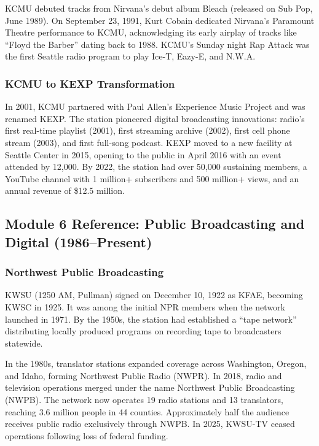 \documentclass[11pt,letterpaper]{article}
\begin{document}
KCMU debuted tracks from Nirvana's debut album Bleach (released on Sub Pop, June 1989). On September 23, 1991, Kurt Cobain dedicated Nirvana's Paramount Theatre performance to KCMU, acknowledging its early airplay of tracks like ``Floyd the Barber'' dating back to 1988. KCMU's Sunday night Rap Attack was the first Seattle radio program to play Ice-T, Eazy-E, and N.W.A.

\subsubsection{KCMU to KEXP Transformation}

In 2001, KCMU partnered with Paul Allen's Experience Music Project and was renamed KEXP. The station pioneered digital broadcasting innovations: radio's first real-time playlist (2001), first streaming archive (2002), first cell phone stream (2003), and first full-song podcast. KEXP moved to a new facility at Seattle Center in 2015, opening to the public in April 2016 with an event attended by 12,000. By 2022, the station had over 50,000 sustaining members, a YouTube channel with 1 million+ subscribers and 500 million+ views, and an annual revenue of \$12.5 million.

\subsection{Module 6 Reference: Public Broadcasting and Digital (1986--Present)}

\subsubsection{Northwest Public Broadcasting}

KWSU (1250 AM, Pullman) signed on December 10, 1922 as KFAE, becoming KWSC in 1925. It was among the initial NPR members when the network launched in 1971. By the 1950s, the station had established a ``tape network'' distributing locally produced programs on recording tape to broadcasters statewide.

In the 1980s, translator stations expanded coverage across Washington, Oregon, and Idaho, forming Northwest Public Radio (NWPR). In 2018, radio and television operations merged under the name Northwest Public Broadcasting (NWPB). The network now operates 19 radio stations and 13 translators, reaching 3.6 million people in 44 counties. Approximately half the audience receives public radio exclusively through NWPB. In 2025, KWSU-TV ceased operations following loss of federal funding.
\end{document}
